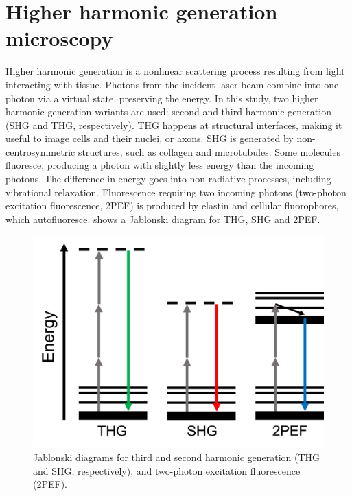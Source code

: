 \section{Higher harmonic generation microscopy}
Higher harmonic generation is a nonlinear scattering process resulting from light interacting with tissue.
Photons from the incident laser beam combine into one photon via a virtual state, preserving the energy.
In this study, two higher harmonic generation variants are used: second and third harmonic generation (SHG and THG, respectively).
THG happens at structural interfaces, making it useful to image \eg cells and their nuclei, or axons.
SHG is generated by non-centrosymmetric structures, such as collagen and microtubules.
Some molecules fluoresce, producing a photon with slightly less energy than the incoming photons.
The difference in energy goes into non-radiative processes, including vibrational relaxation.
Fluorescence requiring two incoming photons (two-photon excitation fluorescence, 2PEF) is produced by elastin and cellular fluorophores, which autofluoresce.
 shows a Jablonski diagram for THG, SHG and 2PEF.

\begin{figure}[hb]
    \centering
    \includegraphics[width=\linewidth]{ANN/images/hhg-jablonski.png}
    \caption[THG, SHG and 2PEF Jablonski diagrams]{Jablonski diagrams for third and second harmonic generation (THG and SHG, respectively), and two-photon excitation fluorescence (2PEF).}
    \label{fig:hhg-jablonski}
\end{figure}
